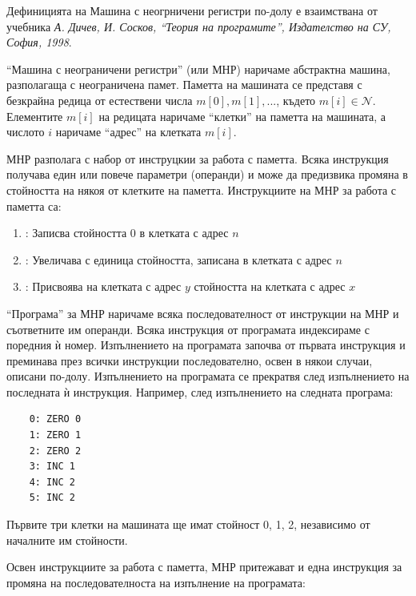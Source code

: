 \small{Дефиницията на Машина с неогрничени регистри по-долу е взаимствана от учебника \cite{tprog}\textit{А. Дичев, И. Сосков, ``Теория на програмите'', Издателство на СУ, София, 1998}.

\vspace{20px}

\begin{mdframed}[hidealllines=true,backgroundcolor=gray!20]

	``Машина с неограничени регистри'' (или МНР) наричаме абстрактна машина, разполагаща с неограничена памет. Паметта на машината се представя с безкрайна редица от естествени числа $m[0],m[1],...$, където $m[i] \in \mathcal{N}$. Елементите $m[i]$ на редицата наричаме ``клетки'' на паметта на машината, а числото $i$ наричаме ``адрес'' на клетката $m[i]$.

	 МНР разполага с набор от инструцкии за работа с паметта. Всяка инструкция получава един или повече параметри (операнди) и може да предизвика промяна в стойността на някоя от клетките на паметта. Инструкциите на МНР за работа с паметта са:

	\begin{enumerate}[label=\arabic*)]
		\item {}: Записва стойността 0 в клетката с адрес $n$
		\item {}: Увеличава с единица стойността, записана в клетката с адрес $n$
		\item {}: Присвоява на клетката с адрес $y$ стойността на клетката с адрес $x$
	\end{enumerate}

	``Програма'' за МНР наричаме всяка последователност от инструкции на МНР и съответните им операнди. Всяка инструкция от програмата индексираме с поредния ѝ номер. Изпълнението на програмата започва от първата инструкция и преминава през всички инструкции последователно, освен в някои случаи, описани по-долу. Изпълнението на програмата се прекратвя след изпълнението на последната ѝ инструкция. Например, след изпълнението на следната програма:

	\begin{verbatim}
	0: ZERO 0
	1: ZERO 1
	2: ZERO 2
	3: INC 1
	4: INC 2
	5: INC 2
	\end{verbatim}

	Първите три клетки на машината ще имат стойност 0, 1, 2, независимо от началните им стойности.

	Освен инструкциите за работа с паметта, МНР притежават и една инструкция за промяна на последователноста на изпълнение на програмата:


\end{mdframed}}

